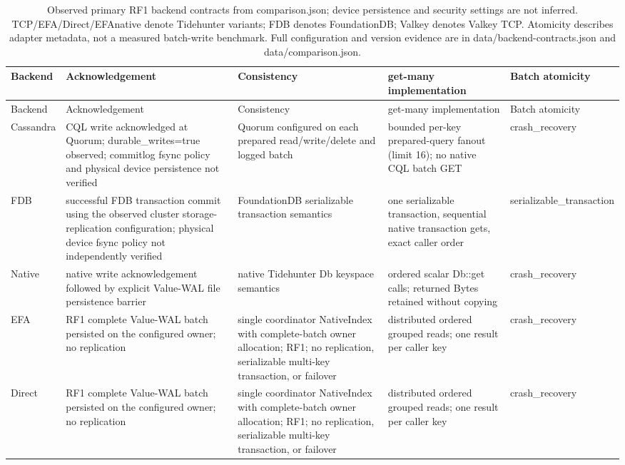 \begin{landscape}
\scriptsize
\setlength{\tabcolsep}{2pt}
\sloppy
\begin{longtable}{p{2cm}p{5cm}p{4.4cm}p{5cm}p{2cm}}
\caption{Observed primary RF1 backend contracts from comparison.json; device persistence and security settings are not inferred. TCP/EFA/Direct/EFAnative denote Tidehunter variants; FDB denotes FoundationDB; Valkey denotes Valkey TCP. Atomicity describes adapter metadata, not a measured batch-write benchmark. Full configuration and version evidence are in data/backend-contracts.json and data/comparison.json.}\label{data-backend-contracts}\\
\toprule
Backend & Acknowledgement & Consistency & get-many implementation & Batch atomicity\\
\midrule
\endfirsthead
\toprule
Backend & Acknowledgement & Consistency & get-many implementation & Batch atomicity\\
\midrule
\endhead
\bottomrule
\endfoot
Cassandra & CQL write acknowledged at Quorum; durable\_\allowbreak{}writes=true observed; commitlog fsync policy and physical device persistence not verified & Quorum configured on each prepared read/write/delete and logged batch & bounded per-key prepared-query fanout (limit 16); no native CQL batch GET & crash\_\allowbreak{}recovery\\
FDB & successful FDB transaction commit using the observed cluster storage-replication configuration; physical device fsync policy not independently verified & FoundationDB serializable transaction semantics & one serializable transaction, sequential native transaction gets, exact caller order & serializable\_\allowbreak{}transaction\\
Native & native write acknowledgement followed by explicit Value-WAL file persistence barrier & native Tidehunter Db keyspace semantics & ordered scalar Db::get calls; returned Bytes retained without copying & crash\_\allowbreak{}recovery\\
EFA & RF1 complete Value-WAL batch persisted on the configured owner; no replication & single coordinator NativeIndex with complete-batch owner allocation; RF1; no replication, serializable multi-key transaction, or failover & distributed ordered grouped reads; one result per caller key & crash\_\allowbreak{}recovery\\
Direct & RF1 complete Value-WAL batch persisted on the configured owner; no replication & single coordinator NativeIndex with complete-batch owner allocation; RF1; no replication, serializable multi-key transaction, or failover & distributed ordered grouped reads; one result per caller key & crash\_\allowbreak{}recovery\\

\end{longtable}
\end{landscape}
